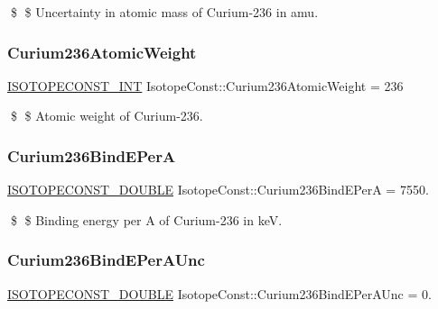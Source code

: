 \$ \$ Uncertainty in atomic mass of Curium-\/236 in amu. \mbox{\label{group___isotope_const-_curium-_cm236_gaa960b88b43436ec90365a83550474b04}} 
\subsubsection{\texorpdfstring{Curium236\+Atomic\+Weight}{Curium236AtomicWeight}}
{\footnotesize\ttfamily \mbox{\hyperlink{group___isotope_const-_macros_ga5f18360b3e99483a35c32d789e62621c}{I\+S\+O\+T\+O\+P\+E\+C\+O\+N\+S\+T\+\_\+\+I\+NT}} Isotope\+Const\+::\+Curium236\+Atomic\+Weight = 236}

\$ \$ Atomic weight of Curium-\/236. \mbox{\label{group___isotope_const-_curium-_cm236_gaabb3a5aaa78843bb10aa0e008a90bd37}} 
\subsubsection{\texorpdfstring{Curium236\+Bind\+E\+PerA}{Curium236BindEPerA}}
{\footnotesize\ttfamily \mbox{\hyperlink{group___isotope_const-_macros_ga8f45a7272ce02c0b4c65c44636ed719a}{I\+S\+O\+T\+O\+P\+E\+C\+O\+N\+S\+T\+\_\+\+D\+O\+U\+B\+LE}} Isotope\+Const\+::\+Curium236\+Bind\+E\+PerA = 7550.}

\$ \$ Binding energy per A of Curium-\/236 in keV. \mbox{\label{group___isotope_const-_curium-_cm236_ga173abc469695524376de5bba7aabaead}} 
\subsubsection{\texorpdfstring{Curium236\+Bind\+E\+Per\+A\+Unc}{Curium236BindEPerAUnc}}
{\footnotesize\ttfamily \mbox{\hyperlink{group___isotope_const-_macros_ga8f45a7272ce02c0b4c65c44636ed719a}{I\+S\+O\+T\+O\+P\+E\+C\+O\+N\+S\+T\+\_\+\+D\+O\+U\+B\+LE}} Isotope\+Const\+::\+Curium236\+Bind\+E\+Per\+A\+Unc = 0.}

